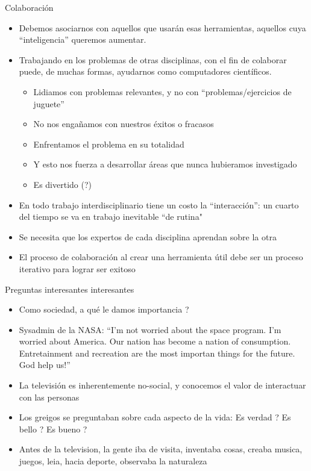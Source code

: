 \documentclass{beamer}
\begin{document}
\begin{frame}{Colaboración}
\begin{itemize}
\item Debemos asociarnos con aquellos que usarán esas herramientas, aquellos cuya ``inteligencia'' queremos aumentar.
\item Trabajando en los problemas de otras disciplinas, con el fin de colaborar puede, de muchas formas, ayudarnos como computadores científicos.
	\begin{itemize}
	\item Lidiamos con problemas relevantes, y no con ``problemas/ejercicios de juguete''
	\item No nos engañamos con nuestros éxitos o fracasos
	\item Enfrentamos el problema en su totalidad
	\item Y esto nos fuerza a desarrollar áreas que nunca hubieramos investigado
	\item Es divertido (?)
	\end{itemize}
\item En todo trabajo interdisciplinario tiene un costo la ``interacción'': un cuarto del tiempo se va en trabajo inevitable ``de rutina"
\item Se necesita que los expertos de cada disciplina aprendan sobre la otra
\item El proceso de colaboración al crear una herramienta útil debe ser un proceso iterativo para lograr ser exitoso

\end{itemize}
\end{frame}

\begin{frame}{Preguntas interesantes interesantes}
\begin{itemize}
\item Como sociedad, a qué le damos importancia ?
\item Sysadmin de la NASA: ``I'm not worried about the space program. I'm worried about America. Our nation has become a nation of consumption. Entretainment and recreation are the most importan things for the future. God help us!''
\item La televisión es inherentemente no-social, y conocemos el valor de interactuar con las personas
\item Los greigos se preguntaban sobre cada aspecto de la vida: Es verdad ? Es bello ? Es bueno ?
\item Antes de la television, la gente iba de visita, inventaba cosas, creaba musica, juegos, leia, hacia deporte, observaba la naturaleza

\end{itemize}
\end{frame}
\end{document}
